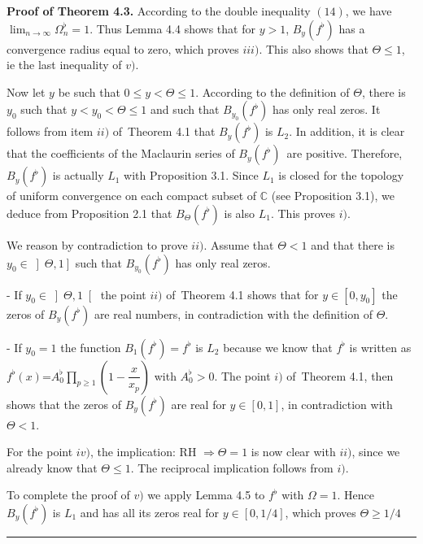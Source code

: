 \documentclass{article}
\newenvironment{proof}[1][Proof]{\textbf{#1.} }{\ \rule{0.5em}{0.5em}}
\begin{document}
\begin{proof}[Proof of Theorem 4.3]
\bigskip According to the double inequality $\left( 14\right) $, we have $\lim_{n\rightarrow \infty }\Omega _{n}^{\flat }=1$. Thus Lemma 4.4 shows
that for $y>1$, $B_{y}\left( f^{\flat }\right) $ has a convergence radius
equal to zero, which proves $iii)$. This also shows that $\Theta \leq 1$, ie
the last inequality of $v)$.

Now let $y$ be such that $0\leq y<\Theta \leq 1$. According to the
definition of $\Theta $, there is $y_{0}$ such that $y<y_{0}<\Theta \leq 1$
and such that $B_{y_{0}}\left( f^{\flat }\right) $ has only real zeros. It
follows from item $ii)$ of\ Theorem 4.1 that $B_{y}\left( f^{\flat }\right) $
is $L_{2}$. In addition, it is clear that the coefficients of the Maclaurin
series of $B_{y}\left( f^{\flat }\right) $\ are positive. Therefore, $B_{y}\left( f^{\flat }\right) $ is actually $L_{1}$ with Proposition 3.1.
Since $L_{1}$ is closed for the topology of uniform convergence on each
compact subset of $\mathbb{C}$ (see Proposition 3.1), we deduce from
Proposition 2.1 that $B_{\Theta }\left( f^{\flat }\right) $ is also $L_{1}$.
This proves $i)$.

We reason by contradiction to prove $ii)$. Assume that $\Theta <1$ and that
there is $y_{0}\in \left] \Theta ,1\right] $ such that $B_{y_{0}}\left(
f^{\flat }\right) $ has only real zeros.

- If $y_{0}\in \left] \Theta ,1\right[ $ the point $ii)$ of\ Theorem 4.1
shows that for $y\in \left[ 0,y_{0}\right] $ the zeros of $B_{y}\left(
f^{\flat }\right) $ are real numbers, in contradiction with the definition
of $\Theta $.

- If $y_{0}=1$ the function $B_{1}\left( f^{\flat }\right) =f^{\flat }$ is $L_{2}$ because we know that $f^{\flat }$ is written as $f^{\flat }\left(
x\right) $=$A_{0}^{\flat }\prod_{p\geq 1}\left( 1-\dfrac{x}{x_{p}}\right) $
with $A_{0}^{\flat }>0$. The point $i)$ of\ Theorem 4.1, then shows that the
zeros of $B_{y}\left( f^{\flat }\right) $ are real for $y\in \left[ 0,1\right] $, in contradiction with $\Theta <1$.

For the point $iv)$, the implication: RH $\Longrightarrow \Theta =1$ is now
clear with $ii)$, since we already know that $\Theta \leq 1$. The reciprocal
implication follows from $i)$.

To complete the proof of $v)$ we apply Lemma 4.5 to $f^{\flat }$ with $\Omega =1$. Hence $B_{y}\left( f^{\flat }\right) $ is $L_{1}$ and has all
its zeros real for $y\in \left[ 0,1/4\right] $, which proves $\Theta \geq 1/4
$
\end{proof}
\end{document}
